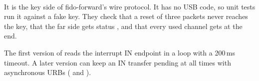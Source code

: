 \paragraph{} It is the key side of fido-forward's wire
protocol. It has no USB code, so unit tests run it against a fake key. They
check that a reset of three packets never reaches the key, that the far side
gets status , and that every used channel gets
 at the end.

\begin{tip}
The first version of  reads the interrupt IN endpoint in
a loop with a 200\,ms timeout. A later version can keep an IN transfer
pending at all times with asynchronous URBs ( and
).
\end{tip}
